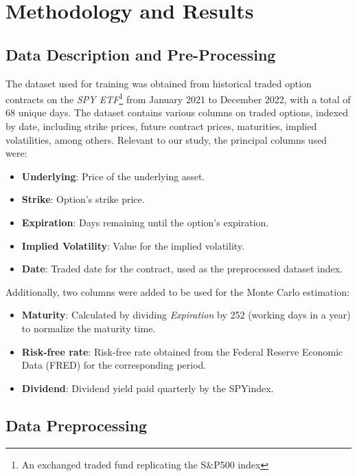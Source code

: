 \section{Methodology and Results}
\label{sec:methodology}

\subsection{Data Description and Pre-Processing}
\label{subsec:data}

The dataset used for training was obtained from historical traded option contracts on the \textit{SPY ETF}\footnote{An exchanged traded fund replicating the S\&P500 index} from January 2021 to December 2022, with a total of 68 unique days.
The dataset contains various columns on traded options, indexed by date, including strike prices, future contract prices, maturities, implied volatilities, among others.
Relevant to our study, the principal columns used were:
\begin{itemize}
    \item \textbf{Underlying}: Price of the underlying asset.
    \item \textbf{Strike}: Option's strike price.
    \item \textbf{Expiration}: Days remaining until the option's expiration.
    \item \textbf{Implied Volatility}: Value for the implied volatility.
    \item \textbf{Date}: Traded date for the contract, used as the preprocessed dataset index.
\end{itemize}

Additionally, two columns were added to be used for the Monte Carlo estimation:
\begin{itemize}
    \item \textbf{Maturity}: Calculated by dividing \textit{Expiration} by 252 (working days in a year) to normalize the maturity time.
    \item \textbf{Risk-free rate}: Risk-free rate obtained from the Federal Reserve Economic Data (FRED) for the corresponding period.
    \item \textbf{Dividend}: Dividend yield paid quarterly by the SPY\@ index.
\end{itemize}

\subsection{Data Preprocessing}
\label{subsec:preprocessing}

